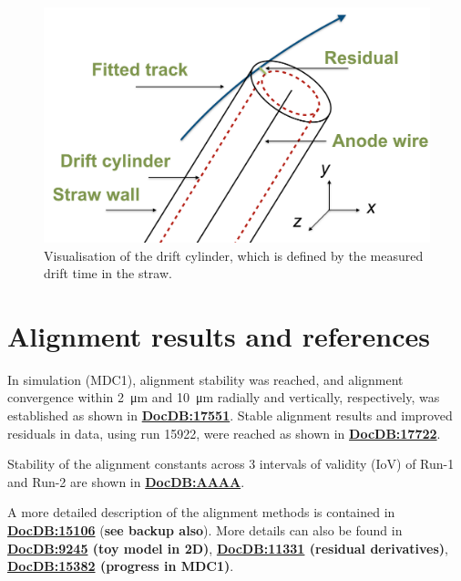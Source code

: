 \documentclass[12pt]{article}
\begin{document}
\begin{figure}[tbp]
\centering
\includegraphics[scale = 0.45]{fig/DriftCylinder.png}  
    \caption{Visualisation of the drift cylinder, which is defined by the measured drift time in the straw.}
\label{fig:DriftCylinder} 
\end{figure}

\section{Alignment results and references}
In simulation (MDC1), alignment stability was reached, and alignment convergence within \SI{2}{\micro\metre} and \SI{10}{\micro\metre} radially and vertically, respectively, was established as shown in \textbf{\href{https://gm2-docdb.fnal.gov/cgi-bin/private/ShowDocument?docid=17551}{DocDB:17551}}. Stable alignment results and improved residuals in data, using run 15922, were reached as shown in \textbf{\href{https://gm2-docdb.fnal.gov/cgi-bin/private/ShowDocument?docid=17722}{DocDB:17722}}.

Stability of the alignment constants across 3 intervals of validity (IoV) of Run-1 and Run-2 are shown in \textbf{\href{https://gm2-docdb.fnal.gov/cgi-bin/private/ShowDocument?docid=AAAA}{DocDB:AAAA}}.

A more detailed description of the alignment methods is contained in \textbf{\href{https://gm2-docdb.fnal.gov/cgi-bin/private/ShowDocument?docid=15106}{DocDB:15106}} (\textbf{see backup also}). More details can also be found in \textbf{\href{https://gm2-docdb.fnal.gov/cgi-bin/private/ShowDocument?docid=9245}{DocDB:9245} (toy model in 2D)}, \textbf{\href{https://gm2-docdb.fnal.gov/cgi-bin/private/ShowDocument?docid=11331}{DocDB:11331} (residual derivatives)}, \textbf{\href{https://gm2-docdb.fnal.gov/cgi-bin/private/ShowDocument?docid=15382}{DocDB:15382} (progress in MDC1)}. 
\end{document}
